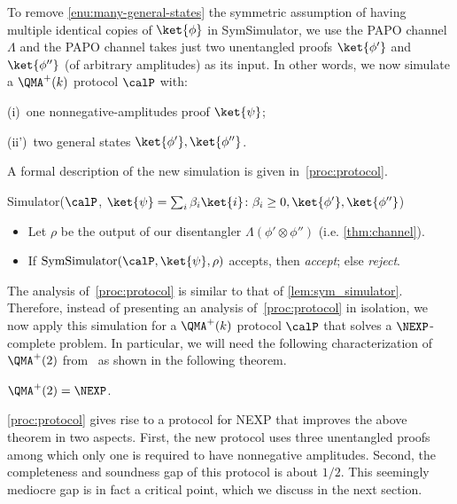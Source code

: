 To remove  \ref{enu:many-general-states} the symmetric assumption of having multiple identical copies of $\ket{\phi}$ in SymSimulator, we use the PAPO channel $\Lambda$ and the PAPO channel takes
just two unentangled proofs $\ket{\phi'}$ and $\ket{\phi''}$ (of arbitrary amplitudes) as its input. In other words, we now simulate a $\QMA^+(k)$ protocol $\calP$ with:
\begin{description}
    \item \; (i)\, one nonnegative-amplitudes proof $\ket{\psi}$;
    \item (ii')\,  two general states $\ket{\phi'}, \ket{\phi''}$.
\end{description} 
A formal description of the new simulation is given in~\cref{proc:protocol}.

\begin{algorithm}[H]{Simulator}{($\calP$, $\ket{\psi} = \sum_i \beta_i \ket{i} \colon \beta_i \ge 0, \ket{\phi'}, \ket{\phi''}$)}
     \begin{itemize}
       \item Let $\rho$ be the output of our disentangler $\Lambda(\phi'\otimes \phi'')$ (i.e. \cref{thm:channel}).
       \item If $\textup{SymSimulator}(\calP, \ket{\psi},\rho)$ accepts, then \emph{accept}; else \emph{reject}.
     \end{itemize}
     \caption{Protocol Simulator}\label{proc:protocol}
\end{algorithm}

The analysis of~\cref{proc:protocol} is similar to that of \cref{lem:sym_simulator}. Therefore, instead of presenting an analysis of~\cref{proc:protocol} in isolation, we now apply this simulation for a $\QMA^+(k)$ protocol $\calP$ that solves a $\NEXP$-complete problem.  
In particular, we will need the following characterization of $\QMA^+(2)$ from~\cite{JW23} as shown in the following theorem.

\begin{theorem}[\cite{JW23}]\label{thm:qma2_plus_nexp}
  $\QMA^+(2) = \NEXP$.
\end{theorem}

\cref{proc:protocol} gives rise to a protocol for NEXP that improves the above theorem in two aspects. First, the new protocol uses three unentangled proofs among which only one is required to have nonnegative amplitudes. Second, the completeness and soundness gap of this protocol is about $1/2$. This seemingly mediocre gap is in fact a critical point, which we discuss in the next section.

